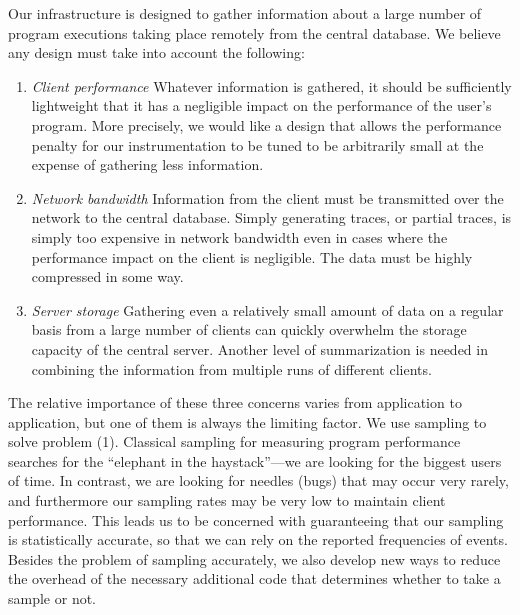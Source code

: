 Our infrastructure is designed to gather information about a
large number of program executions taking place remotely from
the central database.  We believe any design must take into account
the following:
\begin{enumerate}

\item {\em Client performance}  Whatever information is gathered,
it should be sufficiently lightweight that it has a negligible impact
on the performance of the user's program.  More precisely, we would
like a design that allows the performance penalty for our
instrumentation to be tuned to be arbitrarily small at the expense of
gathering less information.

\item {\em Network bandwidth}  Information from the client must
be transmitted over the network to the central database.  Simply
generating traces, or partial traces, is simply too expensive in
network bandwidth even in cases where the performance impact on the
client is negligible.  The data must be highly compressed in some way.

\item {\em Server storage}  Gathering even a relatively small amount of data 
on a regular basis from a large number of clients can quickly 
overwhelm the storage capacity of the central server.  Another level
of summarization is needed in combining the information from 
multiple runs of different clients.

\end{enumerate}

The relative importance of these three concerns varies from
application to application, but one of them is always the limiting
factor.  We use sampling to solve problem (1).  Classical sampling for
measuring program performance searches for the ``elephant in the
haystack''---we are looking for the biggest users of time.  In
contrast, we are looking for needles (bugs) that may occur very
rarely, and furthermore our sampling rates may be very low to maintain
client performance.  This leads us to be concerned with guaranteeing
that our sampling is statistically accurate, so that we can rely on
the reported frequencies of events.
Besides the problem of sampling accurately, we also develop
new ways to reduce the overhead of the necessary additional code
that determines whether to take a sample or not.

